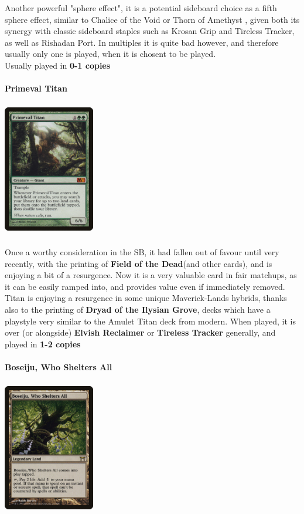 \documentclass{report}
\begin{document}
Another powerful "sphere effect", it is a potential sideboard choice as a fifth sphere effect, similar to Chalice of the Void or Thorn of Amethyst , given both its synergy with classic sideboard staples such as Krosan Grip and Tireless Tracker, as well as Rishadan Port. In multiples it is quite bad however, and therefore usually only one is played, when it is chosent to be played.\\
Usually played in \textbf{0-1 copies}\\\\
\newpage
\textbf{Primeval Titan\\}
\begin{center}
\includegraphics [width = 4cm, height = 6cm] {primeval-titan}
\end{center}
Once a worthy consideration in the SB, it had fallen out of favour until very recently, with the printing of \textbf{Field of the Dead}(and other cards), and is enjoying a bit of a resurgence. Now it is a very valuable card in fair matchups, as it can be easily ramped into, and provides value even if immediately removed. Titan is enjoying a resurgence in some unique Maverick-Lands hybrids, thanks also to the printing of \textbf{Dryad of the Ilysian Grove}, decks which have a playstyle very similar to the Amulet Titan deck from modern. When played, it is over (or alongside) \textbf{Elvish Reclaimer} or \textbf{Tireless Tracker} generally, and played in \textbf{1-2 copies}\\\\
\textbf{Boseiju, Who Shelters All\\}
\begin{center}
\includegraphics [width = 4cm, height = 6cm] {boseiju-who-shelters-all}
\end{center}
\end{document}
